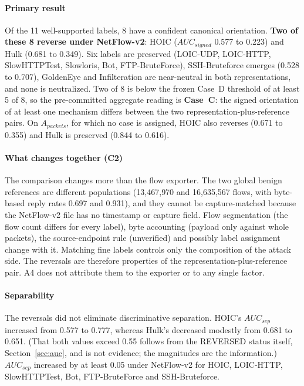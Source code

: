 \documentclass[preprint,12pt]{elsarticle}
\begin{document}
\paragraph{Primary result} Of the 11 well-supported labels, 8 have a confident canonical orientation. \textbf{Two of these 8 reverse under NetFlow-v2}: HOIC ($AUC_{signed}$ 0.577 to 0.223) and Hulk (0.681 to 0.349). Six labels are preserved (LOIC-UDP, LOIC-HTTP, SlowHTTPTest, Slowloris, Bot, FTP-BruteForce), SSH-Bruteforce emerges (0.528 to 0.707), GoldenEye and Infilteration are near-neutral in both representations, and none is neutralized. Two of 8 is below the frozen Case~D threshold of at least 5 of 8, so the pre-committed aggregate reading is \textbf{Case~C}: the signed orientation of at least one mechanism differs between the two representation-plus-reference pairs. On $A_{packets}$, for which no case is assigned, HOIC also reverses (0.671 to 0.355) and Hulk is preserved (0.844 to 0.616).

\paragraph{What changes together (C2)} The comparison changes more than the flow exporter. The two global benign references are different populations (13{,}467{,}970 and 16{,}635{,}567 flows, with byte-based reply rates 0.697 and 0.931), and they cannot be capture-matched because the NetFlow-v2 file has no timestamp or capture field. Flow segmentation (the flow count differs for every label), byte accounting (payload only against whole packets), the source-endpoint rule (unverified) and possibly label assignment change with it. Matching fine labels controls only the composition of the attack side. The reversals are therefore properties of the representation-plus-reference pair. A4 does not attribute them to the exporter or to any single factor.

\paragraph{Separability} The reversals did not eliminate discriminative separation. HOIC's $AUC_{sep}$ increased from 0.577 to 0.777, whereas Hulk's decreased modestly from 0.681 to 0.651. (That both values exceed 0.55 follows from the REVERSED status itself, Section~\ref{sec:auc}, and is not evidence; the magnitudes are the information.) $AUC_{sep}$ increased by at least 0.05 under NetFlow-v2 for HOIC, LOIC-HTTP, SlowHTTPTest, Bot, FTP-BruteForce and SSH-Bruteforce.
\end{document}
